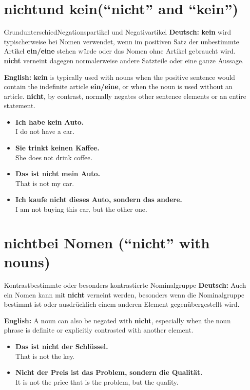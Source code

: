 \documentclass[a4paper,11pt]{article}
\newcommand{\GermanText}[1]{\textbf{Deutsch: }#1\par}
\newcommand{\EnglishText}[1]{{\small\color{SoftGray}\textbf{English: }#1\par}}
\newcommand{\ExampleItem}[2]{\item \textbf{#1}\\{\small\color{SoftGray}#2}}
\begin{document}
\section{\glqq nicht\grqq und \glqq kein\grqq \textnormal{(``nicht'' and ``kein'')}}
\begin{grammarentry}{Grundunterschied}{Negationspartikel und Negativartikel}
\GermanText{\textbf{kein} wird typischerweise bei Nomen verwendet, wenn im positiven Satz der unbestimmte Artikel \textbf{ein/eine} stehen würde oder das Nomen ohne Artikel gebraucht wird. \textbf{nicht} verneint dagegen normalerweise andere Satzteile oder eine ganze Aussage.}
\EnglishText{\textbf{kein} is typically used with nouns when the positive sentence would contain the indefinite article \textbf{ein/eine}, or when the noun is used without an article. \textbf{nicht}, by contrast, normally negates other sentence elements or an entire statement.}
\end{grammarentry}
\begin{exbox}\begin{itemize}
\ExampleItem{Ich habe kein Auto.}{I do not have a car.}
\ExampleItem{Sie trinkt keinen Kaffee.}{She does not drink coffee.}
\ExampleItem{Das ist nicht mein Auto.}{That is not my car.}
\ExampleItem{Ich kaufe nicht dieses Auto, sondern das andere.}{I am not buying this car, but the other one.}
\end{itemize}\end{exbox}

\section{\glqq nicht\grqq bei Nomen \textnormal{(``nicht'' with nouns)}}
\begin{grammarentry}{Kontrast}{bestimmte oder besonders kontrastierte Nominalgruppe}
\GermanText{Auch ein Nomen kann mit \textbf{nicht} verneint werden, besonders wenn die Nominalgruppe bestimmt ist oder ausdrücklich einem anderen Element gegenübergestellt wird.}
\EnglishText{A noun can also be negated with \textbf{nicht}, especially when the noun phrase is definite or explicitly contrasted with another element.}
\end{grammarentry}
\begin{exbox}\begin{itemize}
\ExampleItem{Das ist nicht der Schlüssel.}{That is not the key.}
\ExampleItem{Nicht der Preis ist das Problem, sondern die Qualität.}{It is not the price that is the problem, but the quality.}
\end{itemize}\end{exbox}
\end{document}
